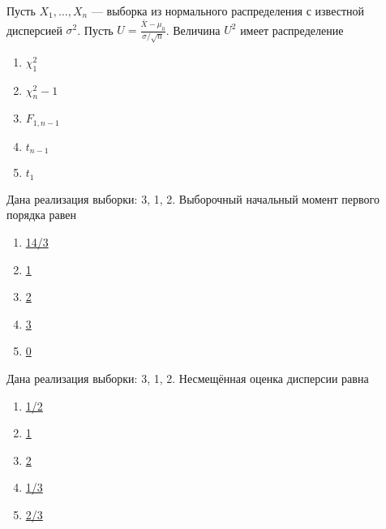 \documentclass[t]{beamer}
\begin{document}
 \begin{frame} \label{19} 
\begin{block}{19} 

  Пусть $X_1,\ldots,X_n$ — выборка из нормального распределения с известной дисперсией $\sigma^2$. Пусть $U = \frac{\bar{X}-\mu_0}{\sigma/\sqrt{n}}$. Величина $U^2$ имеет распределение
  


 \end{block} 
\begin{enumerate} 
\item[] \hyperlink{19-Yes}{\beamergotobutton{} $\chi^2_1$}
\item[] \hyperlink{19-No}{\beamergotobutton{} $\chi^2_n-1$}
\item[] \hyperlink{19-No}{\beamergotobutton{} $F_{1,n-1}$}
\item[] \hyperlink{19-No}{\beamergotobutton{} $t_{n-1}$}
\item[] \hyperlink{19-No}{\beamergotobutton{} $t_1$}
\end{enumerate} 
\end{frame} 


 \begin{frame} \label{20} 
\begin{block}{20} 

  Дана реализация выборки: 3, 1, 2. Выборочный начальный момент первого порядка равен
  


 \end{block} 
\begin{enumerate} 
\item[] \hyperlink{20-No}{\beamergotobutton{} 14/3}
\item[] \hyperlink{20-No}{\beamergotobutton{} 1}
\item[] \hyperlink{20-Yes}{\beamergotobutton{} 2}
\item[] \hyperlink{20-No}{\beamergotobutton{} 3}
\item[] \hyperlink{20-No}{\beamergotobutton{} 0}
\end{enumerate} 
\end{frame} 


 \begin{frame} \label{21} 
\begin{block}{21} 

  Дана реализация выборки: 3, 1, 2. Несмещённая оценка дисперсии равна
  


 \end{block} 
\begin{enumerate} 
\item[] \hyperlink{21-No}{\beamergotobutton{} 1/2}
\item[] \hyperlink{21-Yes}{\beamergotobutton{} 1}
\item[] \hyperlink{21-No}{\beamergotobutton{} 2}
\item[] \hyperlink{21-No}{\beamergotobutton{} 1/3}
\item[] \hyperlink{21-No}{\beamergotobutton{} 2/3}
\end{enumerate} 
\end{frame} 
\end{document}
